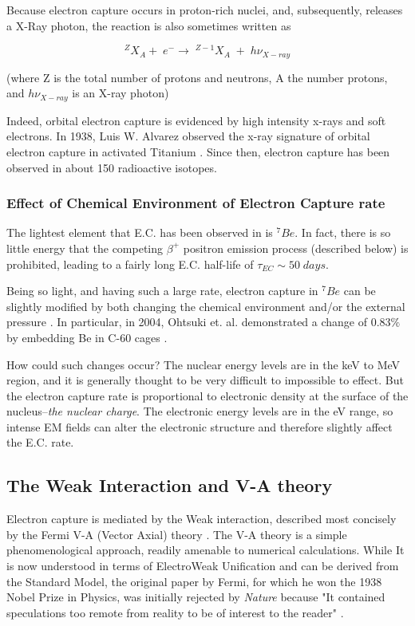 \documentclass[%
 aip,
 jmp,%
 amsmath,amssymb,
 reprint,%
]{revtex4-1}
\begin{document}
Because electron capture occurs in proton-rich nuclei, and, subsequently, releases a X-Ray photon, the reaction is also sometimes written as

$$^{Z}X_{A}+\;e^{-}\rightarrow\;^{Z-1}X_{A}\;+\;h\nu_{X-ray}$$

(where Z is the total number of protons and neutrons, A the number protons, and $h\nu_{X-ray}$ is an X-ray photon)

Indeed, orbital electron capture is evidenced by high intensity x-rays and soft electrons.  In 1938, Luis W. Alvarez observed the x-ray signature of orbital electron capture in activated Titanium \cite{alvarez}. Since then, electron capture has been observed in about 150 radioactive isotopes.


\subsubsection{Effect of Chemical Environment of Electron Capture rate}

The lightest element that E.C. has been observed in is $^{7}Be$\cite{radbook}. In fact, there is so little energy that the competing $\beta^{+}$ positron emission process (described below) is prohibited, leading to a fairly long E.C. half-life of $\tau_{EC}\sim 50\;days$.

Being so light, and having such a large rate, electron capture in $^{7}Be$ can be slightly modified by both changing the chemical environment and/or the external pressure \cite{wang,raydas,ohtsuki}. In particular, in 2004, Ohtsuki et. al. demonstrated a change of $0.83\%$  by embedding Be in C-60 cages \cite{ohtsuki}.

How could such changes occur?  The nuclear energy levels are in the keV to MeV region, and it is generally thought to be very difficult to impossible to effect.  But the electron capture rate is proportional to electronic density at the surface of the nucleus--\emph{the nuclear charge}.   The electronic energy levels are in the eV range, so intense EM fields can alter the electronic structure and therefore slightly affect the E.C. rate. 

\subsection{The Weak Interaction and V-A theory}

Electron capture is mediated by the Weak interaction, described most concisely by the Fermi V-A (Vector Axial) theory \cite{fermi1,ec-review1,ec-review2}.
The V-A theory is a simple phenomenological approach, readily amenable to numerical calculations.  While It is now understood in terms of ElectroWeak Unification and can be derived from the Standard Model, the original paper by Fermi, for which he won the 1938 Nobel Prize in Physics, was initially rejected by \emph{Nature} because "It contained speculations too remote from reality to be of interest to the reader" \cite{close}.
\end{document}
